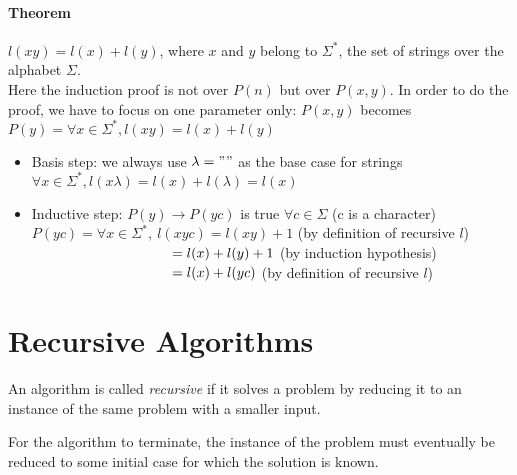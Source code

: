\documentclass[10pt,a4paper]{book}
\begin{document}
\paragraph*{Theorem}
$l(xy)=l(x)+l(y)$, where $x$ and $y$ belong to $\Sigma^{*}$, the set of strings over the alphabet $\Sigma$.\\
Here the induction proof is not over $P(n)$ but over $P(x,y)$. In order to do the proof, we have to focus on one parameter only: $P(x,y)$ becomes $P(y)= \forall x \in \Sigma^{*}, l(xy)=l(x)+l(y)$
\begin{itemize}
\item Basis step: we always use $\lambda = ""$ as the base case for strings\\
$\forall x \in \Sigma^{*}, l(x\lambda) = l(x)+l(\lambda) = l(x)$
\item Inductive step: $P(y) \to P(yc)$ is true $\forall c \in \Sigma$ (c is a character)\\
$P(yc) = \forall x \in \Sigma^{*},\ l(xyc) = l(xy) + 1$ (by definition of recursive $l$)\\
$\hspace*{100pt} = l(x) + l(y) +1$ (by induction hypothesis)\\
$\hspace*{100pt} = l(x) + l(yc)$ (by definition of recursive $l$)
\end{itemize}
\section{Recursive Algorithms}
An algorithm is called \textit{recursive} if it solves a problem by reducing it to an instance of the same problem with a smaller input.\par
For the algorithm to terminate, the instance of the problem must eventually be reduced to some initial case for which the solution is known.
\end{document}

